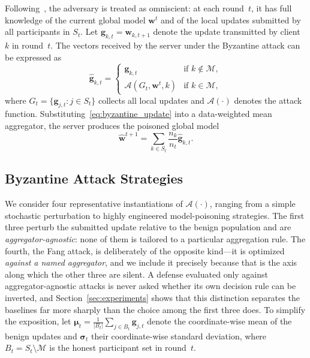 \documentclass[journal]{IEEEtran}
\begin{document}
Following~\cite{shejwalkar2021manipulating, baruch2019little}, the adversary is treated as omniscient: at each round~$t$, it has full knowledge of the current global model $\mathbf{w}^t$ and of the local updates submitted by all participants in $S_t$. Let $\mathbf{g}_{k,t} = \mathbf{w}_{k,t+1}$ denote the update transmitted by client~$k$ in round~$t$. The vectors received by the server under the Byzantine attack can be expressed as
\begin{equation}
\hat{\mathbf{g}}_{k,t} =
\begin{cases}
\mathbf{g}_{k,t} & \text{if } k \notin \mathcal{M}, \\
\mathcal{A}(G_t, \mathbf{w}^t, k) & \text{if } k \in \mathcal{M},
\end{cases}
\label{eq:byzantine_update}
\end{equation}
where $G_t = \{\mathbf{g}_{j,t} : j \in S_t\}$ collects all local updates and $\mathcal{A}(\cdot)$ denotes the attack function. Substituting~\eqref{eq:byzantine_update} into a data-weighted mean aggregator, the server produces the poisoned global model
\begin{equation}
\hat{\mathbf{w}}^{t+1} = \sum_{k \in S_t} \frac{n_k}{n_t} \hat{\mathbf{g}}_{k,t}.
\label{eq:poisoned_agg}
\end{equation}

\subsection{Byzantine Attack Strategies}

We consider four representative instantiations of $\mathcal{A}(\cdot)$, ranging from a simple stochastic perturbation to highly engineered model-poisoning strategies. The first three perturb the submitted update relative to the benign population and are \emph{aggregator-agnostic}: none of them is tailored to a particular aggregation rule. The fourth, the Fang attack, is deliberately of the opposite kind---it is optimized \emph{against a named aggregator}, and we include it precisely because that is the axis along which the other three are silent. A defense evaluated only against aggregator-agnostic attacks is never asked whether its own decision rule can be inverted, and Section~\ref{sec:experiments} shows that this distinction separates the baselines far more sharply than the choice among the first three does. To simplify the exposition, let $\boldsymbol{\mu}_t = \frac{1}{|B_t|} \sum_{j \in B_t} \mathbf{g}_{j,t}$ denote the coordinate-wise mean of the benign updates and $\boldsymbol{\sigma}_t$ their coordinate-wise standard deviation, where $B_t = S_t \setminus \mathcal{M}$ is the honest participant set in round~$t$.
\end{document}
